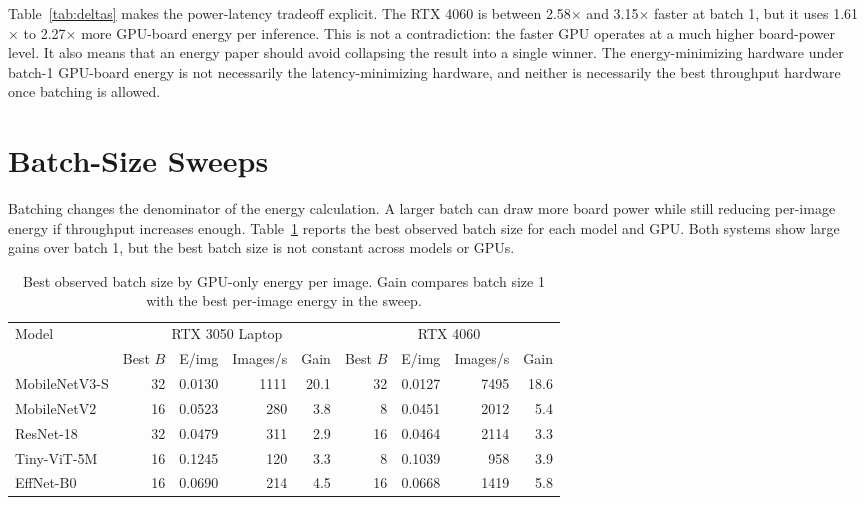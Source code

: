 \documentclass[conference]{IEEEtran}
\begin{document}
Table~\ref{tab:deltas} makes the power-latency tradeoff explicit. The RTX 4060
is between 2.58$\times$ and 3.15$\times$ faster at batch 1, but it uses
1.61$\times$ to 2.27$\times$ more GPU-board energy per inference. This is not
a contradiction: the faster GPU operates at a much higher board-power level.
It also means that an energy paper should avoid collapsing the result into a
single winner. The energy-minimizing hardware under batch-1 GPU-board energy is
not necessarily the latency-minimizing hardware, and neither is necessarily the
best throughput hardware once batching is allowed.

\section{Batch-Size Sweeps}

Batching changes the denominator of the energy calculation. A larger batch can
draw more board power while still reducing per-image energy if throughput
increases enough. Table~\ref{tab:bestbatch} reports the best observed batch
size for each model and GPU. Both systems show large gains over batch 1, but
the best batch size is not constant across models or GPUs.

\begin{table}[t]
\centering
\caption{Best observed batch size by GPU-only energy per image. Gain compares
batch size 1 with the best per-image energy in the sweep.}
\label{tab:bestbatch}
\scriptsize
\begin{tabular}{@{}lrrrrrrrr@{}}
\toprule
Model & \multicolumn{4}{c}{RTX 3050 Laptop} &
\multicolumn{4}{c}{RTX 4060}\\
\cmidrule(lr){2-5}\cmidrule(lr){6-9}
 & Best $B$ & E/img & Images/s & Gain &
 Best $B$ & E/img & Images/s & Gain\\
\midrule
MobileNetV3-S & 32 & 0.0130 & 1111 & 20.1 & 32 & 0.0127 & 7495 & 18.6\\
MobileNetV2 & 16 & 0.0523 & 280 & 3.8 & 8 & 0.0451 & 2012 & 5.4\\
ResNet-18 & 32 & 0.0479 & 311 & 2.9 & 16 & 0.0464 & 2114 & 3.3\\
Tiny-ViT-5M & 16 & 0.1245 & 120 & 3.3 & 8 & 0.1039 & 958 & 3.9\\
EffNet-B0 & 16 & 0.0690 & 214 & 4.5 & 16 & 0.0668 & 1419 & 5.8\\
\bottomrule
\end{tabular}
\end{table}
\end{document}
